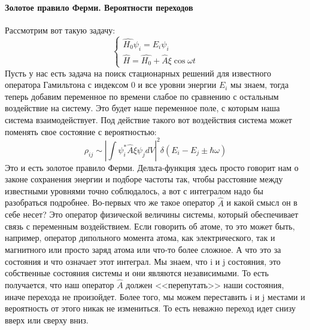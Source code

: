\documentclass[12pt]{article}
\begin{document}
\paragraph{Золотое правило Ферми. Вероятности переходов}
Рассмотрим вот такую задачу:
\begin{equation*}
    \begin{cases}
    \hat{H_0}\psi_i=E_i\psi_i\\
    \hat{H}=\hat{H_0}+\hat{A}\xi \cos{\omega t}
    \end{cases}
\end{equation*}
Пусть у нас есть задача на поиск стационарных решений для известного оператора Гамильтона с индексом 0 и все уровни энергии $E_i$ мы знаем, тогда теперь добавим переменное по времени слабое по сравнению с остальным воздействие на систему. Это будет наше переменное поле, с которым наша система взаимодействует. Под действие такого вот воздействия система может поменять свое состояние с вероятностью:
\begin{equation*}
    \rho_{ij} \sim \left| \int \psi^*_i\hat{A}\xi\psi_j dV\right|^2 \delta (E_i-E_j \pm \hbar \omega)
\end{equation*}
Это и есть золотое правило Ферми. Дельта-функция здесь просто говорит нам о законе сохранения энергии и подборе частоты так, чтобы расстояние между известными уровнями точно соблюдалось, а вот с интегралом надо бы разобраться подробнее. Во-первых что же такое оператор $\hat{A}$ и какой смысл он в себе несет? Это оператор физической величины системы, который обеспечивает связь с переменным воздействием. Если говорить об атоме, то это может быть, например, оператор дипольного момента атома, как электрического, так и магнитного или просто заряд атома или что-то более сложное. А что это за состояния и что означает этот интеграл. Мы знаем, что i и j состояния, это собственные состояния системы и они являются независимыми. То есть получается, что наш оператор $\hat{A}$ должен <<перепутать>> наши состояния, иначе перехода не произойдет. Более того, мы можем переставить i и j местами и вероятность от этого никак не измениться. То есть неважно переход идет снизу вверх или сверху вниз.
\end{document}
